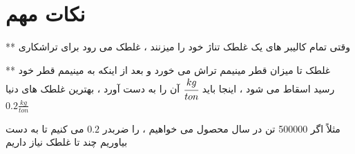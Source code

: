 \documentclass[12pt]{article}
\begin{document}
\section{نکات مهم}


** وقتی تمام کالیبر های یک غلطک تناژ خود را میزنند ، غلطک می رود برای تراشکاری


** غلطک تا میزان قطر مینیمم تراش می خورد و بعد از اینکه به مینیمم قطر خود رسید اسقاط می شود ، اینجا باید
 $ \cfrac{kg}{ton} $
  آن را به دست آورد ، بهترین غلطک های دنیا
$ 0.2 \frac{kg}{ton} $

مثلاً اگر 500000 تن در سال محصول می خواهیم ، 
را ضربدر 
$0.2$
می کنیم تا به دست بیاوریم چند تا غلطک نیاز داریم
\end{document}
